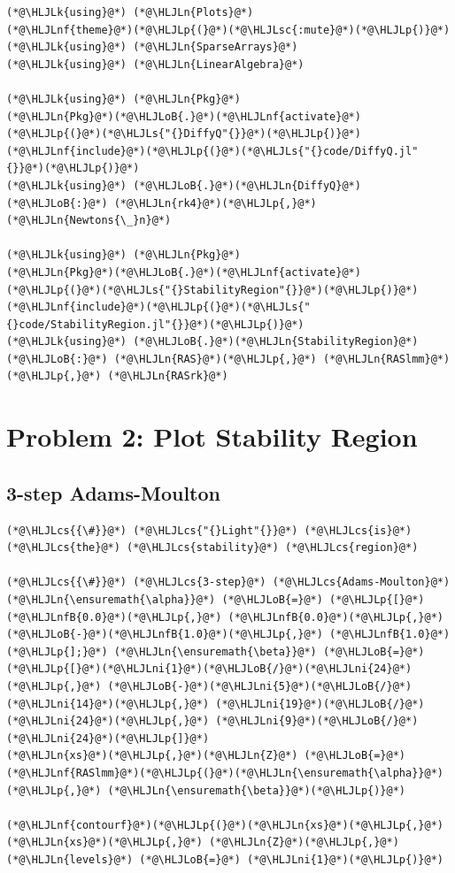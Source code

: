 \documentclass[12pt,a4paper]{article}
\newcommand{\HLJLk}[1]{\textcolor[RGB]{148,91,176}{\textbf{#1}}}
\newcommand{\HLJLn}[1]{#1}
\newcommand{\HLJLnf}[1]{\textcolor[RGB]{66,102,213}{#1}}
\newcommand{\HLJLs}[1]{\textcolor[RGB]{201,61,57}{#1}}
\newcommand{\HLJLsc}[1]{\textcolor[RGB]{201,61,57}{#1}}
\newcommand{\HLJLnfB}[1]{\textcolor[RGB]{59,151,46}{#1}}
\newcommand{\HLJLni}[1]{\textcolor[RGB]{59,151,46}{#1}}
\newcommand{\HLJLoB}[1]{\textcolor[RGB]{102,102,102}{\textbf{#1}}}
\newcommand{\HLJLp}[1]{#1}
\newcommand{\HLJLcs}[1]{\textcolor[RGB]{153,153,119}{\textit{#1}}}
\begin{document}
\begin{lstlisting}
(*@\HLJLk{using}@*) (*@\HLJLn{Plots}@*)
(*@\HLJLnf{theme}@*)(*@\HLJLp{(}@*)(*@\HLJLsc{:mute}@*)(*@\HLJLp{)}@*)
(*@\HLJLk{using}@*) (*@\HLJLn{SparseArrays}@*)
(*@\HLJLk{using}@*) (*@\HLJLn{LinearAlgebra}@*)

(*@\HLJLk{using}@*) (*@\HLJLn{Pkg}@*)
(*@\HLJLn{Pkg}@*)(*@\HLJLoB{.}@*)(*@\HLJLnf{activate}@*)(*@\HLJLp{(}@*)(*@\HLJLs{"{}DiffyQ"{}}@*)(*@\HLJLp{)}@*)
(*@\HLJLnf{include}@*)(*@\HLJLp{(}@*)(*@\HLJLs{"{}code/DiffyQ.jl"{}}@*)(*@\HLJLp{)}@*)
(*@\HLJLk{using}@*) (*@\HLJLoB{.}@*)(*@\HLJLn{DiffyQ}@*)(*@\HLJLoB{:}@*) (*@\HLJLn{rk4}@*)(*@\HLJLp{,}@*) (*@\HLJLn{Newtons{\_}n}@*)

(*@\HLJLk{using}@*) (*@\HLJLn{Pkg}@*)
(*@\HLJLn{Pkg}@*)(*@\HLJLoB{.}@*)(*@\HLJLnf{activate}@*)(*@\HLJLp{(}@*)(*@\HLJLs{"{}StabilityRegion"{}}@*)(*@\HLJLp{)}@*)
(*@\HLJLnf{include}@*)(*@\HLJLp{(}@*)(*@\HLJLs{"{}code/StabilityRegion.jl"{}}@*)(*@\HLJLp{)}@*)
(*@\HLJLk{using}@*) (*@\HLJLoB{.}@*)(*@\HLJLn{StabilityRegion}@*)(*@\HLJLoB{:}@*) (*@\HLJLn{RAS}@*)(*@\HLJLp{,}@*) (*@\HLJLn{RASlmm}@*)(*@\HLJLp{,}@*) (*@\HLJLn{RASrk}@*)
\end{lstlisting}


\section{Problem 2: Plot Stability Region}
\subsection{3-step Adams-Moulton}

\begin{lstlisting}
(*@\HLJLcs{{\#}}@*) (*@\HLJLcs{"{}Light"{}}@*) (*@\HLJLcs{is}@*) (*@\HLJLcs{the}@*) (*@\HLJLcs{stability}@*) (*@\HLJLcs{region}@*)

(*@\HLJLcs{{\#}}@*) (*@\HLJLcs{3-step}@*) (*@\HLJLcs{Adams-Moulton}@*)
(*@\HLJLn{\ensuremath{\alpha}}@*) (*@\HLJLoB{=}@*) (*@\HLJLp{[}@*)(*@\HLJLnfB{0.0}@*)(*@\HLJLp{,}@*) (*@\HLJLnfB{0.0}@*)(*@\HLJLp{,}@*) (*@\HLJLoB{-}@*)(*@\HLJLnfB{1.0}@*)(*@\HLJLp{,}@*) (*@\HLJLnfB{1.0}@*)(*@\HLJLp{];}@*) (*@\HLJLn{\ensuremath{\beta}}@*) (*@\HLJLoB{=}@*) (*@\HLJLp{[}@*)(*@\HLJLni{1}@*)(*@\HLJLoB{/}@*)(*@\HLJLni{24}@*)(*@\HLJLp{,}@*) (*@\HLJLoB{-}@*)(*@\HLJLni{5}@*)(*@\HLJLoB{/}@*)(*@\HLJLni{14}@*)(*@\HLJLp{,}@*) (*@\HLJLni{19}@*)(*@\HLJLoB{/}@*)(*@\HLJLni{24}@*)(*@\HLJLp{,}@*) (*@\HLJLni{9}@*)(*@\HLJLoB{/}@*)(*@\HLJLni{24}@*)(*@\HLJLp{]}@*)
(*@\HLJLn{xs}@*)(*@\HLJLp{,}@*)(*@\HLJLn{Z}@*) (*@\HLJLoB{=}@*) (*@\HLJLnf{RASlmm}@*)(*@\HLJLp{(}@*)(*@\HLJLn{\ensuremath{\alpha}}@*)(*@\HLJLp{,}@*) (*@\HLJLn{\ensuremath{\beta}}@*)(*@\HLJLp{)}@*)

(*@\HLJLnf{contourf}@*)(*@\HLJLp{(}@*)(*@\HLJLn{xs}@*)(*@\HLJLp{,}@*) (*@\HLJLn{xs}@*)(*@\HLJLp{,}@*) (*@\HLJLn{Z}@*)(*@\HLJLp{,}@*) (*@\HLJLn{levels}@*) (*@\HLJLoB{=}@*) (*@\HLJLni{1}@*)(*@\HLJLp{)}@*)
\end{lstlisting}
\end{document}
